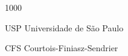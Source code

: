 \begin{listofabbrv}{1000}
	\item [USP] Universidade de S\~ ao Paulo
	\item [CFS] Courtois-Finiasz-Sendrier
\end{listofabbrv}
